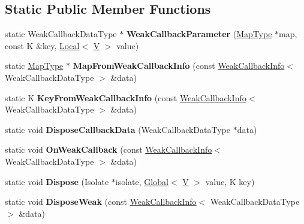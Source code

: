 \subsection*{Static Public Member Functions}
\begin{DoxyCompactItemize}
\item 
\mbox{\label{classv8_1_1DefaultGlobalMapTraits_a3d4b483a077d6e5665cc62a23c719ee8}} 
static Weak\+Callback\+Data\+Type $\ast$ {\bfseries Weak\+Callback\+Parameter} (\mbox{\hyperlink{classv8_1_1GlobalValueMap}{Map\+Type}} $\ast$map, const K \&key, \mbox{\hyperlink{classv8_1_1Local}{Local}}$<$ \mbox{\hyperlink{classV}{V}} $>$ value)
\item 
\mbox{\label{classv8_1_1DefaultGlobalMapTraits_ae65c4d78f93d033712aa328654c00250}} 
static \mbox{\hyperlink{classv8_1_1GlobalValueMap}{Map\+Type}} $\ast$ {\bfseries Map\+From\+Weak\+Callback\+Info} (const \mbox{\hyperlink{classv8_1_1WeakCallbackInfo}{Weak\+Callback\+Info}}$<$ Weak\+Callback\+Data\+Type $>$ \&data)
\item 
\mbox{\label{classv8_1_1DefaultGlobalMapTraits_a2ebc8d3bbfbe32598863ab44caa36207}} 
static K {\bfseries Key\+From\+Weak\+Callback\+Info} (const \mbox{\hyperlink{classv8_1_1WeakCallbackInfo}{Weak\+Callback\+Info}}$<$ Weak\+Callback\+Data\+Type $>$ \&data)
\item 
\mbox{\label{classv8_1_1DefaultGlobalMapTraits_a106883e8168f48826fcfb71aa88e7994}} 
static void {\bfseries Dispose\+Callback\+Data} (Weak\+Callback\+Data\+Type $\ast$data)
\item 
\mbox{\label{classv8_1_1DefaultGlobalMapTraits_a2e50fabc65cf498e981015c1e92ece3e}} 
static void {\bfseries On\+Weak\+Callback} (const \mbox{\hyperlink{classv8_1_1WeakCallbackInfo}{Weak\+Callback\+Info}}$<$ Weak\+Callback\+Data\+Type $>$ \&data)
\item 
\mbox{\label{classv8_1_1DefaultGlobalMapTraits_af2a539ddbe5db2b6e1e944590e1dd7e6}} 
static void {\bfseries Dispose} (Isolate $\ast$isolate, \mbox{\hyperlink{classv8_1_1Global}{Global}}$<$ \mbox{\hyperlink{classV}{V}} $>$ value, K key)
\item 
\mbox{\label{classv8_1_1DefaultGlobalMapTraits_ad3478535925c0f42664c97c4d35d1c91}} 
static void {\bfseries Dispose\+Weak} (const \mbox{\hyperlink{classv8_1_1WeakCallbackInfo}{Weak\+Callback\+Info}}$<$ Weak\+Callback\+Data\+Type $>$ \&data)
\end{DoxyCompactItemize}
